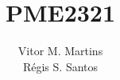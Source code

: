 \documentclass[a4paper,12pt]{memoir}
\title{PME2321}
\author{Vitor M. Martins\\ R\'egis S. Santos}
\date{}
\begin{document}
\begin{titlingpage}
  \maketitle
\end{titlingpage}

\tableofcontents
\end{document}
